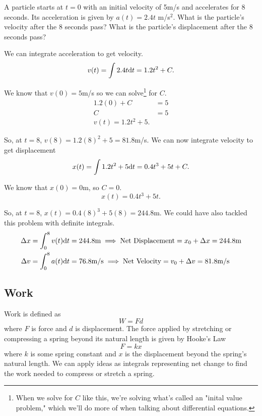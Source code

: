 \begin{example}
	A particle starts at $t=0$ with an initial velocity of 5m/s and accelerates for 8 seconds.
	Its acceleration is given by $a(t)=2.4t$ m/s$^2$.
	What is the particle's velocity after the 8 seconds pass?
	What is the particle's displacement after the 8 seconds pass?
\end{example}
\begin{answer}
	We can integrate acceleration to get velocity.
	\begin{equation*}
		v(t) = \int{2.4t\mathrm{d} t} = 1.2t^2 + C.
	\end{equation*}
	
	We know that $v(0)=5$m/s so we can solve\footnote{When we solve for $C$ like this, we're solving what's called an "inital value problem," which we'll do more of when talking about differential equations.} for $C$.
	\begin{align*}
		1.2(0) + C &= 5 \\
		C &= 5 \\
		v(t) = 1.2t^2 + 5.
	\end{align*}
	
	So, at $t=8$, $v(8) = 1.2(8)^2 + 5 = 81.8$m/s.
	We can now integrate velocity to get displacement
	\begin{equation*}
		x(t) = \int{1.2t^2 + 5 \mathrm{d} t} = 0.4t^3 + 5t + C.
	\end{equation*}
	
	We know that $x(0)=0$m, so $C=0$.
	\begin{equation*}
		x(t) = 0.4t^3 + 5t.
	\end{equation*}
	
	So, at $t=8$, $x(t) = 0.4(8)^3 + 5(8) = 244.8$m.
	We could have also tackled this problem with definite integrals.
	\begin{align*}
		\Delta x = \int_{0}^{8}{v(t)\mathrm{d} t} &= 244.8\text{m} \implies \text{Net Displacement} = x_0 + \Delta x = 244.8\text{m} \\
		\Delta v = \int_{0}^{8}{a(t)\mathrm{d} t} &= 76.8\text{m/s} \implies \text{Net Velocity} = v_0 + \Delta v = 81.8\text{m/s}
	\end{align*}
\end{answer}

\subsection{Work}
Work is defined as
\begin{equation*}
	W = Fd
\end{equation*}
where $F$ is force and $d$ is displacement.
The force applied by stretching or compressing a spring beyond its natural length is given by Hooke's Law
\begin{equation*}
	F = kx
\end{equation*}
where $k$ is some spring constant and $x$ is the displacement beyond the spring's natural length.
We can apply ideas as integrals representing net change to find the work needed to compress or stretch a spring.

